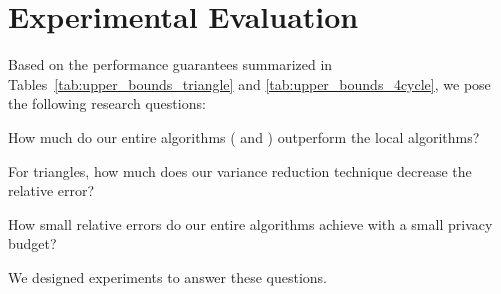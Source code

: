 \section{Experimental Evaluation}
\label{sec:experiments}
Based on the performance guarantees summarized in Tables~\ref{tab:upper_bounds_triangle} and \ref{tab:upper_bounds_4cycle}, we pose the following research questions: 

\begin{description}[leftmargin=8.75mm]
    \item[RQ1.] 
    How much do our entire algorithms (\AlgWSTriVR{} and \AlgWSCyc{}) outperform the local algorithms?
    \item[RQ2.] 
    For triangles, how much does our variance reduction technique decrease the relative error?
    \item[RQ3.] 
    How small relative errors do our entire algorithms 
    achieve with a small privacy budget?
\end{description}
We designed experiments to answer these questions. 

